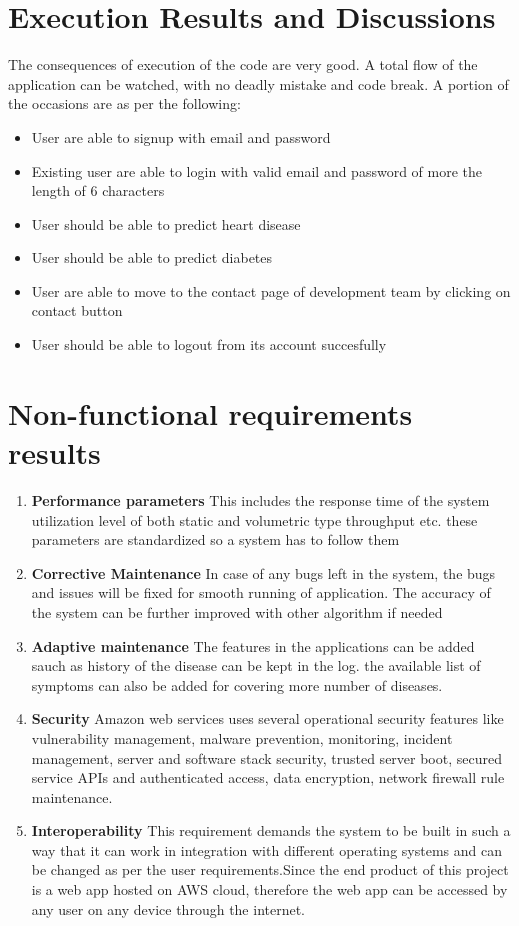 \documentclass[oneside,12pt]{Classes/VTU}
\begin{document}
	\section{Execution Results and Discussions}
	The consequences of execution of the code are very good. A total flow of the application can be watched, with no deadly mistake and code break. A portion of the occasions are as per the following:
	\begin{itemize}
		\item User are able to signup with email and password
		\item Existing user are able to login with valid email and password of more the length of 6 characters
		\item User should be able to predict heart disease 
		\item User should be able to predict diabetes  
		\item User are able to move to the contact page of development team by clicking on contact button 
		\item User should be able to logout from its account succesfully 
		
	\end{itemize}
	\section{Non-functional requirements results}
	\begin{enumerate}
		\item \textbf{Performance parameters} This includes the response time of the system utilization level of both static and volumetric type throughput etc. these parameters are standardized so a system has to follow them
		\item \textbf{Corrective Maintenance} In case of any bugs left in the system, the bugs and issues will be fixed for smooth running of application. The accuracy of the system can be further improved with other algorithm if needed
		\item \textbf{Adaptive maintenance} The features in the applications can be added sauch as history of the disease can be kept in the log. the available list of symptoms can also be added for covering more number of diseases.
		\item \textbf{Security} Amazon web services uses several operational security features like vulnerability management, malware prevention, monitoring, incident management, server and software stack security, trusted server boot, secured service APIs and authenticated access, data encryption, network firewall rule maintenance. 
		\item \textbf{Interoperability} This requirement demands the system to be built in such a way that it can work in integration with different operating systems and can be changed as per the user requirements.Since the end product of this project is a web app hosted on AWS cloud, therefore the web app can be accessed by any user on any device through the internet. 
	\end{enumerate}
	
\end{document}
